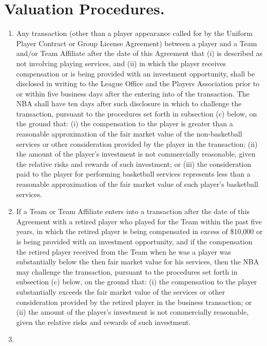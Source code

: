 \documentclass[
]{book}
\begin{document}
\hypertarget{valuation-procedures.}{%
\section{Valuation Procedures.}\label{valuation-procedures.}}

\begin{enumerate}
\def\labelenumi{(\alph{enumi})}
\item
  Any transaction (other than a player appearance called for by the Uniform Player Contract or Group License Agreement) between a player and a Team and/or Team Affiliate after the date of this Agreement that (i) is described as not involving playing services, and (ii) in which the player receives compensation or is being provided with an investment opportunity, shall be disclosed in writing to the League Office and the Players Association prior to or within five business days after the entering into of the transaction. The NBA shall have ten days after such disclosure in which to challenge the transaction, pursuant to the procedures set forth in subsection (c) below, on the ground that: (i) the compensation to the player is greater than a reasonable approximation of the fair market value of the non-basketball services or other consideration provided by the player in the transaction; (ii) the amount of the player's investment is not commercially reasonable, given the relative risks and rewards of such investment; or (iii) the consideration paid to the player for performing basketball services represents less than a reasonable approximation of the fair market value of such player's basketball services.
\item
  If a Team or Team Affiliate enters into a transaction after the date of this Agreement with a retired player who played for the Team within the past five years, in which the retired player is being compensated in excess of \$10,000 or is being provided with an investment opportunity, and if the compensation the retired player received from the Team when he was a player was substantially below the then fair market value for his services, then the NBA may challenge the transaction, pursuant to the procedures set forth in subsection (c) below, on the ground that: (i) the compensation to the player substantially exceeds the fair market value of the services or other consideration provided by the retired player in the business transaction; or (ii) the amount of the player's investment is not commercially reasonable, given the relative risks and rewards of such investment.
\item

\end{enumerate}
\end{document}
